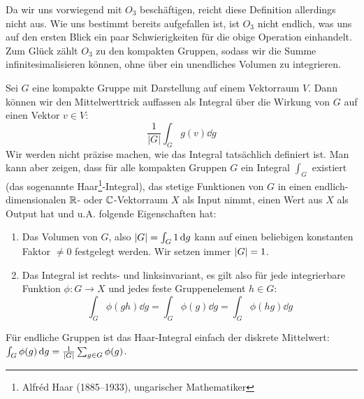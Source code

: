 Da wir uns vorwiegend mit $O_3$ beschäftigen, reicht diese Definition allerdings nicht aus. Wie uns bestimmt bereits aufgefallen ist, ist $O_3$ nicht endlich, was uns auf den ersten Blick ein paar Schwierigkeiten für die obige Operation einhandelt. Zum Glück zählt $O_3$ zu den kompakten Gruppen, sodass wir die Summe infinitesimalisieren können, ohne über ein unendliches Volumen zu integrieren.
\begin{definition}
	Sei $G$ eine kompakte Gruppe mit Darstellung auf einem Vektorraum $V$. Dann können wir den Mittelwerttrick auffassen als Integral über die Wirkung von $G$ auf einen Vektor $v\in V$:
	\[
		\frac{1}{|G|} \int_{G} g(v) \dd g
	\]
	Wir werden nicht präzise machen, wie das Integral tatsächlich definiert ist. Man kann aber zeigen, dass für alle kompakten Gruppen $G$ ein Integral $\int_G$ existiert (das sogenannte Haar\footnote{Alfréd Haar (1885--1933), ungarischer Mathematiker}-Integral), das stetige Funktionen von $G$ in einen endlich-dimensionalen $\mathbb{R}$- oder $\mathbb{C}$-Vektorraum $X$ als Input nimmt, einen Wert aus $X$ als Output hat und u.A. folgende Eigenschaften hat: 
	\begin{enumerate}
		\item Das Volumen von $G$, also $\lvert G\rvert = \int_G 1 \,\textrm{d} g$ kann auf einen beliebigen konstanten Faktor $\neq0$ festgelegt werden. Wir setzen immer $\lvert G\rvert=1$.
		\item Das Integral ist rechts- und linksinvariant, es gilt also für jede integrierbare Funktion $\phi: G\to X$ und jedes feste Gruppenelement $h\in G$:
			\[
			\int_{G} \phi(gh) \dd g = \int_{G} \phi(g) \dd g  = \int_{G} \phi(hg) \dd g 
			\]
	\end{enumerate}
	Für endliche Gruppen ist das Haar-Integral einfach der diskrete Mittelwert: $\int_G \phi(g) \,\textrm{d} g = \frac{1}{\lvert G\rvert} \sum_{g\in G} \phi(g)$.
\end{definition}
